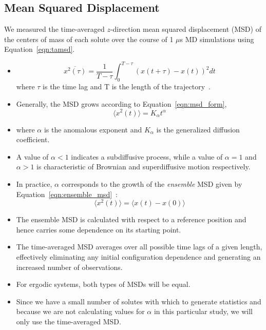 \documentclass{article}
\begin{document}
  \subsection*{Mean Squared Displacement}\label{method:MSD}

  \noindent We measured the time-averaged $z$-direction mean squared 
  displacement (MSD) of the centers of mass of each solute over the 
  course of 1 $\mu$s MD simulations using Equation~\ref{eqn:tamsd}.
  \begin{itemize}
    \item \begin{equation}
	\overline{x^2(\tau)} = \dfrac{1}{T - \tau}\int_{0}^{T - \tau} (x(t + \tau) - x(t))^2 dt
	\label{eqn:tamsd}
	\end{equation}
	where $\tau$ is the time lag and T is the length of the
	trajectory~\cite{meroz_toolbox_2015}. 
	\item Generally, the MSD grows according to Equation~\ref{eqn:msd_form},
	\begin{equation} 
	\langle x^2(t) \rangle = K_{\alpha}t^\alpha
	\label{eqn:msd_form}
	\end{equation} 
	\item where $\alpha$ is the anomalous exponent and $K_\alpha$ is the
	generalized diffusion coefficient.
	\item A value of $\alpha < 1$ indicates a subdiffusive process, while a value of
	$\alpha = 1$ and $\alpha > 1$ is characteristic of Brownian and superdiffusive
	motion respectively.
	\item In practice, $\alpha$ corresponds to the growth of the \textit{ensemble}
	MSD given by Equation~\ref{eqn:ensemble_msd}~\cite{meroz_toolbox_2015}:
	\begin{equation}
	\langle x^2(t) \rangle = \langle x(t) - x(0) \rangle
	\label{eqn:ensemble_msd}
	\end{equation}
	\item The ensemble MSD is calculated with respect to a reference position and
	hence carries some dependence on its starting point.
	\item The time-averaged MSD averages over all possible time lags of a given 
	length, effectively eliminating any initial configuration dependence and generating
	an increased number of observations. 
	\item For ergodic systems, both types of MSDs will be equal.
	\item Since we have a small number of solutes with which to generate statistics
	and because we are not calculating values for $\alpha$ in this particular study,
	we will only use the time-averaged MSD.
  \end{itemize}  
  
\end{document}
